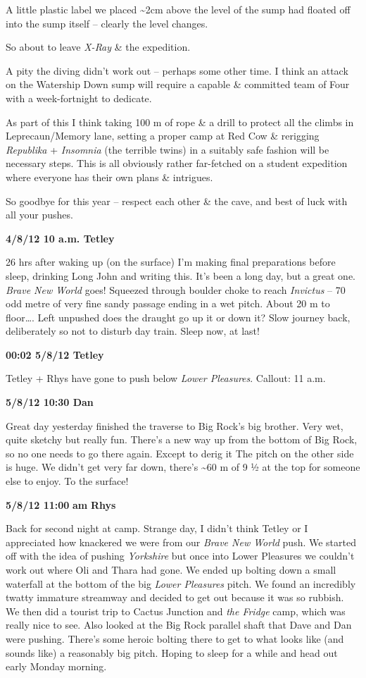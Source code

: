 A little plastic label we placed \textasciitilde 2cm above the level of
the sump had floated off into the sump itself -- clearly the level
changes.

So about to leave \emph{X-Ray} \& the expedition.

A pity the diving didn't work out -- perhaps some other time. I think an
attack on the Watership Down sump will require a capable \& committed
team of Four with a week-fortnight to dedicate.

As part of this I think taking 100 m of rope \& a drill to protect all
the climbs in Leprecaun/Memory lane, setting a proper camp at Red Cow \&
rerigging \emph{Republika} + \emph{Insomnia} (the terrible twins) in a
suitably safe fashion will be necessary steps. This is all obviously
rather far-fetched on a student expedition where everyone has their own
plans \& intrigues.

So goodbye for this year -- respect each other \& the cave, and best of
luck with all your pushes.

\textbf{4/8/12 10 a.m. Tetley}

26 hrs after waking up (on the surface) I'm making final preparations
before sleep, drinking Long John and writing this. It's been a long day,
but a great one. \emph{Brave New World} goes! Squeezed through boulder
choke to reach \emph{Invictus} -- 70 odd metre of very fine sandy
passage ending in a wet pitch. About 20 m to floor\ldots{}. Left
unpushed does the draught go up it or down it? Slow journey back,
deliberately so not to disturb day train. Sleep now, at last!

\textbf{00:02 5/8/12 Tetley}

Tetley + Rhys have gone to push below \emph{Lower Pleasures}. Callout:
11 a.m.

\textbf{5/8/12 10:30 Dan}

Great day yesterday finished the traverse to Big Rock's big brother.
Very wet, quite sketchy but really fun. There's a new way up from the
bottom of Big Rock, so no one needs to go there again. Except to derig
it The pitch on the other side is huge. We didn't get very far down,
there's \textasciitilde 60 m of 9 ½ at the top for someone else to
enjoy. To the surface!

\textbf{5/8/12 11:00} \textbf{am} \textbf{Rhys}

Back for second night at camp. Strange day, I didn't think Tetley or I
appreciated how knackered we were from our \emph{Brave New World} push.
We started off with the idea of pushing \emph{Yorkshire} but once into
Lower Pleasures we couldn't work out where Oli and Thara had gone. We
ended up bolting down a small waterfall at the bottom of the big
\emph{Lower Pleasures} pitch. We found an incredibly twatty immature
streamway and decided to get out because it was so rubbish. We then did
a tourist trip to Cactus Junction and \emph{the Fridge} camp, which was
really nice to see. Also looked at the Big Rock parallel shaft that Dave
and Dan were pushing. There's some heroic bolting there to get to what
looks like (and sounds like) a reasonably big pitch. Hoping to sleep for
a while and head out early Monday morning.

